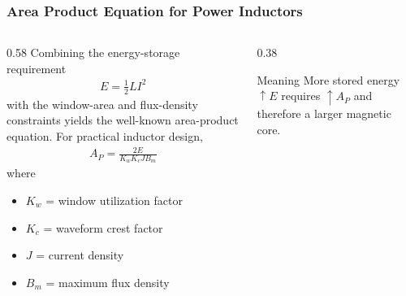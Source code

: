 \begin{frame} \frametitle{Area Product Equation for Power Inductors} 
    \begin{columns} 
        \begin{column}{0.58\textwidth} 
            Combining the energy-storage requirement
            \begin{align} 
                E=\frac12LI^2 
            \end{align} with the window-area and flux-density constraints yields the well-known area-product equation.
            \vspace{0.15cm} For practical inductor design,
            \begin{align} 
                A_P = \frac{2E} {K_wK_cJB_m} 
            \end{align} where 
            \begin{itemize} 
                \item $K_w$ = window utilization factor 
                \item $K_c$ = waveform crest factor 
                \item $J$ = current density 
                \item $B_m$ = maximum flux density 
            \end{itemize} 
        \end{column} 
        \begin{column}{0.38\textwidth} 
            \begin{block}{Meaning} More stored energy $\uparrow E$ requires $\uparrow A_P$ and therefore a larger magnetic core. 
            \end{block} 
        \end{column} 
    \end{columns} 
\end{frame} 
